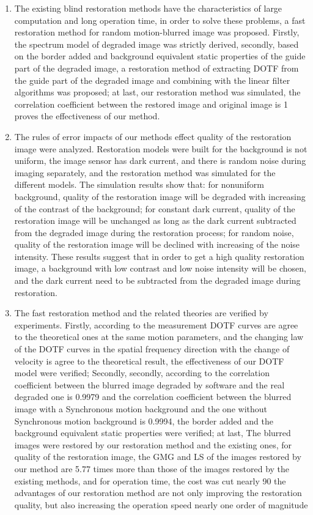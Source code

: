 \begin{englishabstract}
\begin{enumerate}
\item The existing blind restoration methods have the characteristics of large computation and long operation time, in order to solve these problems, a fast restoration method
for random motion-blurred image was proposed. Firstly, the spectrum model of degraded
image was strictly derived, secondly, based on the border added and background equivalent static properties of the guide part of the degraded image, a restoration method of
extracting DOTF from the guide part of the degraded image and combining with the linear filter algorithms was proposed; at last, our restoration method was simulated, the
correlation coefficient between the restored image and original image is 1 proves the effectiveness of our method.

\item The rules of error impacts of our methods effect quality of the restoration
image were analyzed. Restoration models were built for the background is not uniform,
the image sensor has dark current, and there is random noise during imaging separately,
and the restoration method was simulated for the different models. The simulation results
show that: for nonuniform background, quality of the restoration image will be degraded
with increasing of the contrast of the background; for constant dark current, quality of
the restoration image will be unchanged as long as the dark current subtracted from the
degraded image during the restoration process; for random noise, quality of the restoration
image will be declined with increasing of the noise intensity. These results suggest that in
order to get a high quality restoration image, a background with low contrast and low noise
intensity will be chosen, and the dark current need to be subtracted from the degraded
image during restoration.

 \item The fast restoration method and the related theories are verified by experiments. Firstly, according to the measurement DOTF curves are agree to the theoretical
 ones at the same motion parameters, and the changing law of the DOTF curves in the
 spatial frequency direction with the change of velocity is agree to the theoretical result,
 the effectiveness of our DOTF model were verified; Secondly, secondly, according to
 the correlation coefficient between the blurred image degraded by software and the real
 degraded one is 0.9979 and the correlation coefficient between the blurred image with a
 Synchronous motion background and the one without Synchronous motion background is
 0.9994, the border added and the background equivalent static properties were verified; at
 last, The blurred images were restored by our restoration method and the existing ones, for
 quality of the restoration image, the GMG and LS of the images restored by our method
 are 5.77 times more than those of the images restored by the existing methods, and for
 operation time, the cost was cut nearly 90%
 the advantages of our restoration method are not only improving the restoration quality,
 but also increasing the operation speed nearly one order of magnitude
\end{enumerate}
	

\end{englishabstract}
